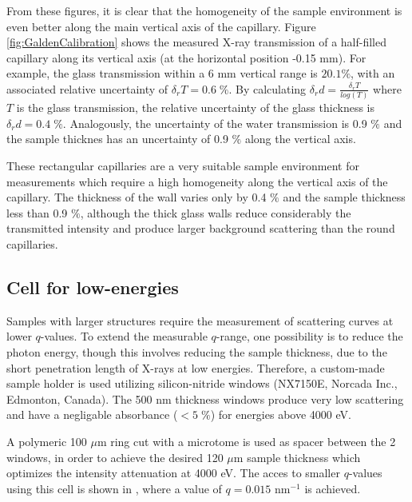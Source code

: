 From these figures, it is clear that the homogeneity of the sample environment is even better along the main vertical axis of the capillary. Figure \ref{fig:GaldenCalibration} shows the measured X-ray transmission of a half-filled capillary along its vertical axis (at the horizontal position -0.15 mm). For example, the glass transmission within a 6 mm vertical range is $20.1\%$, with an associated relative uncertainty of $\delta_r T =0.6 \; \%$. By calculating $\delta_r d = \frac{\delta_r T}{log(T)}$ where $T$ is the glass transmission, the relative uncertainty of the glass thickness is $\delta_r d = 0.4 \; \%$. Analogously, the uncertainty of the water transmission is 0.9 $\%$ and the sample thicknes has an uncertainty of 0.9 $\%$ along the vertical axis.

These rectangular capillaries are a very suitable sample environment for measurements which require a high homogeneity along the vertical axis of the capillary. The thickness of the wall varies only by 0.4 $\%$ and the sample thickness less than 0.9 $\%$, although the thick glass walls reduce considerably the transmitted intensity and produce larger background scattering than the round capillaries.

\subsection{Cell for low-energies}

Samples with larger structures require the measurement of scattering curves at lower $q$-values. To extend the measurable $q$-range, one possibility is to reduce the photon energy, though this involves reducing the sample thickness, due to the short penetration length of X-rays at low energies. Therefore, a custom-made sample holder is used utilizing silicon-nitride windows (NX7150E, Norcada Inc., Edmonton, Canada). The 500 nm thickness windows produce very low scattering and have a negligable absorbance ($<5\;\%$) for energies above 4000 eV.

A polymeric 100 $\mu$m ring cut with a microtome is used as spacer between the 2 windows, in order to achieve the desired 120 $\mu$m sample thickness which optimizes the intensity attenuation at 4000 eV. The acces to smaller $q$-values using this cell is shown in \cite{varga_towards_2014}, where a value of $q=0.015$ nm$^{-1}$ is achieved.

